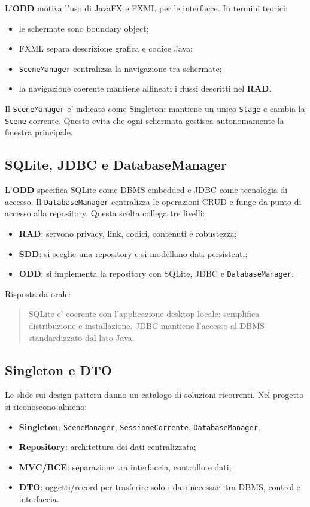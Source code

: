 ﻿\documentclass[11pt,a4paper]{article}
\newcommand{\doc}[1]{\textbf{#1}}
\newcommand{\term}[1]{\textbf{#1}}
\begin{document}
L'\doc{ODD} motiva l'uso di JavaFX e FXML per le interfacce. In termini teorici:
\begin{itemize}
  \item le schermate sono boundary object;
  \item FXML separa descrizione grafica e codice Java;
  \item \texttt{SceneManager} centralizza la navigazione tra schermate;
  \item la navigazione coerente mantiene allineati i flussi descritti nel \doc{RAD}.
\end{itemize}

Il \texttt{SceneManager} e' indicato come Singleton: mantiene un unico \texttt{Stage} e
cambia la \texttt{Scene} corrente. Questo evita che ogni schermata gestisca autonomamente
la finestra principale.

\subsection{SQLite, JDBC e DatabaseManager}

L'\doc{ODD} specifica SQLite come DBMS embedded e JDBC come tecnologia di accesso. Il
\texttt{DatabaseManager} centralizza le operazioni CRUD e funge da punto di accesso alla
repository. Questa scelta collega tre livelli:
\begin{itemize}
  \item \doc{RAD}: servono privacy, link, codici, contenuti e robustezza;
  \item \doc{SDD}: si sceglie una repository e si modellano dati persistenti;
  \item \doc{ODD}: si implementa la repository con SQLite, JDBC e \texttt{DatabaseManager}.
\end{itemize}

Risposta da orale:
\begin{quote}
SQLite e' coerente con l'applicazione desktop locale: semplifica distribuzione e
installazione. JDBC mantiene l'accesso al DBMS standardizzato dal lato Java.
\end{quote}

\subsection{Singleton e DTO}

Le slide sui design pattern danno un catalogo di soluzioni ricorrenti. Nel progetto si
riconoscono almeno:
\begin{itemize}
  \item \term{Singleton}: \texttt{SceneManager}, \texttt{SessioneCorrente},
  \texttt{DatabaseManager};
  \item \term{Repository}: architettura dei dati centralizzata;
  \item \term{MVC/BCE}: separazione tra interfaccia, controllo e dati;
  \item \term{DTO}: oggetti/record per trasferire solo i dati necessari tra DBMS, control
  e interfaccia.
\end{itemize}
\end{document}
